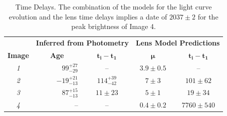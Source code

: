 \documentclass[12pt]{article}
\begin{document}
\begin{table}
\centering
\begin{tabular}{crc|cc}
    \multicolumn{1}{c}{}&
    \multicolumn{2}{c}{\textbf{Inferred from Photometry}}&\multicolumn{2}{c}{\textbf{Lens Model Predictions}}\\
    \multicolumn{1}{c}{\textbf{Image}} &\multicolumn{1}{c}{\textbf{Age}} &\multicolumn{1}{c}{$\mathbf{t_i-t_1}$}&\multicolumn{1}{c}{$\mathbf{\mu}$}
    &\multicolumn{1}{c}{$\mathbf{t_i-t_1}$}\\
    
\midrule
\textit{1}  & $99^{+27}_{-29}$ & -- & $3.9\pm0.5$ & --\\
\textit{2} & $-19^{+21}_{-13}$ & $114^{+39}_{-42}$ & $7\pm3$ & $101\pm62$ \\
\textit{3} & $87^{+15}_{-13}$ & $11\pm23$ & $5\pm1$ & $19\pm34$ \\
\textit{4} & -- & -- & $0.4\pm0.2$ & $7760\pm540$\\

\end{tabular}
\caption{\label{tab:time_delays}Time Delays.  The combination of the models for the light curve evolution and the lens time delays implies a date of $2037\pm2$ for the peak brightness of Image 4.}
\end{table}
\end{document}
